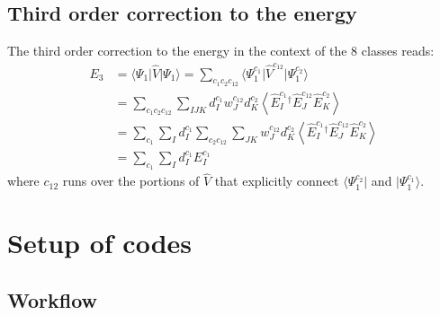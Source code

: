 \documentclass{article}
\newcommand  \equ[2]       {\begin{align}#2\label{#1}\end{align}}
\newcommand  \bra[1]       {\langle #1 \vert}
\newcommand  \ket[1]       {\vert #1  \rangle}
\newcommand  \expect[3]    {\langle  #1 \vert #2 \vert #3 \rangle}
\newcommand  \Expect[1]    {\left\langle  #1 \right\rangle}
\begin{document}
\subsection{Third order correction to the energy}

The third order correction to the energy in the context of the 8 classes reads:
\equ{ }{
  E_3
  &=\expect{\Psi_1}{\hat{V}}{\Psi_1}
   =\sum_{c_1 c_2 c_{12}}
 \expect{\Psi_1^{c_1}}{\hat{V}^{c_{12}}}{\Psi_1^{c_2}}
 \nonumber\\ 
 &=\sum_{c_1 c_2 c_{12}}\sum_{I J K }
 d^{c_1}_I  w^{c_{12}}_J  d^{c_2}_K  \Expect{ \hat{E}_I ^{c_1}{}^\dagger\hat{E}_J ^{c_{12}}\hat{E}_K ^{c_2}}
 \nonumber\\ 
 &=\sum_{c_1} \sum_I  d^{c_1}_I  \sum_{c_2 c_{12}} \sum_{J K }
 w^{c_{12}}_J  d^{c_2}_K  \Expect{ \hat{E}_I ^{c_1}{}^\dagger\hat{E}_J ^{c_{12}}\hat{E}_K ^{c_2}}
 \nonumber\\ 
  &=
  \sum_{c_1} \sum_I  d^{c_1}_I  E^{c_1}_I 
}
where $c_{12}$ runs over the portions of $\hat{V}$ that
explicitly connect $\bra{\Psi_1^{c_2}}$ and $\ket{\Psi_1^{c_1}}$.

\section{Setup of codes}

\subsection{Workflow}
\end{document}
